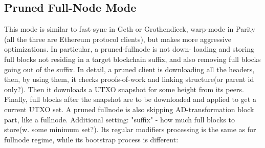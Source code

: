\documentclass[]{report}   %
\begin{document}
\subsection{Pruned Full-Node Mode}
This mode is similar to fast-sync in Geth or Grothendieck, warp-mode in Parity (all the three are Ethereum protocol clients), but makes more aggressive optimizations. In particular, a pruned-fullnode is not down- loading and storing full blocks not residing in a target blockchain suffix, and also removing full blocks going out of the suffix.
In detail, a pruned client is downloading all the headers, then, by using them, it checks proofs-of-work and linking structure(or parent id only?). Then it downloads a UTXO snapshot for some height from its peers. Finally, full blocks after the snapshot are to be downloaded and applied to get a current UTXO set.
A pruned fullnode is also skipping AD-transformation block part, like a fullnode. Additional setting: "suffix" - how much full blocks to store(w. some minimum set?).
Its regular modifiers processing is the same as for fullnode regime, while its bootstrap process is different:
\end{document}
